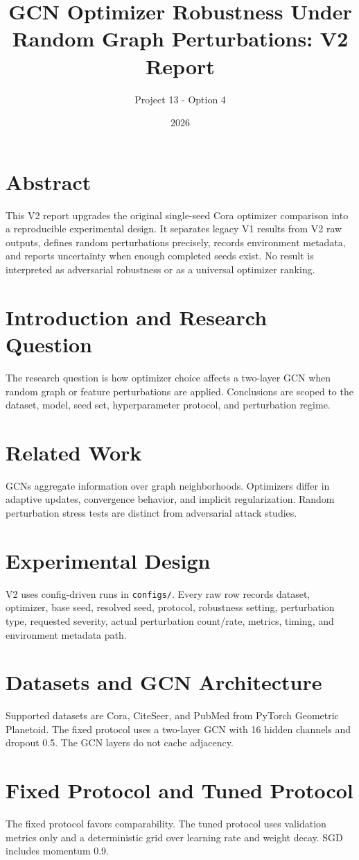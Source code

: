 \documentclass[11pt]{article}
\title{GCN Optimizer Robustness Under Random Graph Perturbations: V2 Report}
\author{Project 13 - Option 4}
\date{2026}
\begin{document}
\maketitle
\tableofcontents
\section{Abstract}
This V2 report upgrades the original single-seed Cora optimizer comparison into a reproducible experimental design. It separates legacy V1 results from V2 raw outputs, defines random perturbations precisely, records environment metadata, and reports uncertainty when enough completed seeds exist. No result is interpreted as adversarial robustness or as a universal optimizer ranking.
\section{Introduction and Research Question}
The research question is how optimizer choice affects a two-layer GCN when random graph or feature perturbations are applied. Conclusions are scoped to the dataset, model, seed set, hyperparameter protocol, and perturbation regime.
\section{Related Work}
GCNs aggregate information over graph neighborhoods. Optimizers differ in adaptive updates, convergence behavior, and implicit regularization. Random perturbation stress tests are distinct from adversarial attack studies.
\section{Experimental Design}
V2 uses config-driven runs in \texttt{configs/}. Every raw row records dataset, optimizer, base seed, resolved seed, protocol, robustness setting, perturbation type, requested severity, actual perturbation count/rate, metrics, timing, and environment metadata path.
\section{Datasets and GCN Architecture}
Supported datasets are Cora, CiteSeer, and PubMed from PyTorch Geometric Planetoid. The fixed protocol uses a two-layer GCN with 16 hidden channels and dropout 0.5. The GCN layers do not cache adjacency.
\section{Fixed Protocol and Tuned Protocol}
The fixed protocol favors comparability. The tuned protocol uses validation metrics only and a deterministic grid over learning rate and weight decay. SGD includes momentum 0.9.
\end{document}
